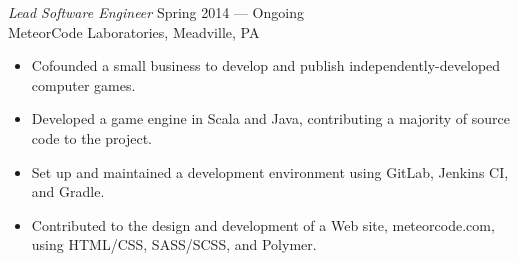 \documentclass[margin]{res}
\begin{document}
\begin{resume}
                {\sl Lead Software Engineer} \hfill  Spring 2014 --- Ongoing \\
                MeteorCode Laboratories, Meadville, PA
                 \begin{itemize}  \itemsep -2pt %
                    \item Cofounded a small business to develop and publish independently-developed computer games. 
                    \item Developed a game engine in Scala and Java, contributing a majority of source code to the project.
                    \item Set up and maintained a development environment using GitLab, Jenkins CI, and Gradle.
        \item Contributed to the design and development of a Web site, meteorcode.com, using HTML/CSS, SASS/SCSS, and Polymer.
                 \end{itemize}
                
 


\end{resume}
\end{document}
